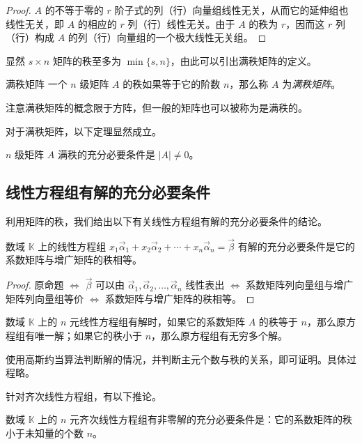 \begin{proof}
	$A$ 的不等于零的 $r$ 阶子式的列（行）向量组线性无关，从而它的延伸组也线性无关，即 $A$ 的相应的 $r$ 列（行）线性无关。由于 $A$ 的秩为 $r$，因而这 $r$ 列（行）构成 $A$ 的列（行）向量组的一个极大线性无关组。
\end{proof}

显然 $s \times n$ 矩阵的秩至多为 $\min \{s, n\}$，由此可以引出满秩矩阵的定义。

\begin{definition}{满秩矩阵}
	一个 $n$ 级矩阵 $A$ 的秩如果等于它的阶数 $n$，那么称 $A$ 为\emph{满秩矩阵}。
\end{definition}

注意满秩矩阵的概念限于方阵，但一般的矩阵也可以被称为是满秩的。

对于满秩矩阵，以下定理显然成立。

\begin{theorem}
	$n$ 级矩阵 $A$ 满秩的充分必要条件是 $|A| \ne 0$。
\end{theorem}

\subsection{线性方程组有解的充分必要条件}

利用矩阵的秩，我们给出以下有关线性方程组有解的充分必要条件的结论。

\begin{theorem}
	数域 $\mathbb K$ 上的线性方程组 $x_1 \vec \alpha_1 + x_2 \vec \alpha_2 + \cdots + x_n \vec \alpha_n = \vec \beta$ 有解的充分必要条件是它的系数矩阵与增广矩阵的秩相等。
\end{theorem}

\begin{proof}
	原命题 $\Longleftrightarrow$ $\vec \beta$ 可以由 $\vec \alpha_1, \vec \alpha_2, \ldots, \vec \alpha_n$ 线性表出 $\Longleftrightarrow$ 系数矩阵列向量组与增广矩阵列向量组等价 $\Longleftrightarrow$ 系数矩阵与增广矩阵的秩相等。
\end{proof}

\begin{theorem}
	数域 $\mathbb K$ 上的 $n$ 元线性方程组有解时，如果它的系数矩阵 $A$ 的秩等于 $n$，那么原方程组有唯一解；如果它的秩小于 $n$，那么原方程组有无穷多个解。
\end{theorem}

使用高斯约当算法判断解的情况，并判断主元个数与秩的关系，即可证明。具体过程略。

针对齐次线性方程组，有以下推论。

\begin{theorem}
	数域 $\mathbb K$ 上的 $n$ 元齐次线性方程组有非零解的充分必要条件是：它的系数矩阵的秩小于未知量的个数 $n$。
\end{theorem}